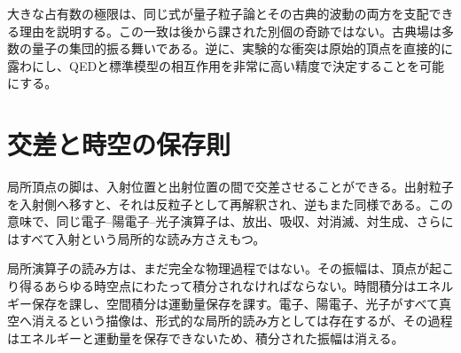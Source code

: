 \begin{classroomqa}
\end{classroomqa}

\begin{classroomqa}
\end{classroomqa}

大きな占有数の極限は、同じ式が量子粒子論とその古典的波動の両方を支配できる理由を説明する。この一致は後から課された別個の奇跡ではない。古典場は多数の量子の集団的振る舞いである。逆に、実験的な衝突は原始的頂点を直接的に露わにし、QEDと標準模型の相互作用を非常に高い精度で決定することを可能にする。

\section{交差と時空の保存則}

局所頂点の脚は、入射位置と出射位置の間で交差させることができる。出射粒子を入射側へ移すと、それは反粒子として再解釈され、逆もまた同様である。この意味で、同じ電子--陽電子--光子演算子は、放出、吸収、対消滅、対生成、さらにはすべて入射という局所的な読み方さえもつ。

\begin{classroomqa}
\end{classroomqa}

局所演算子の読み方は、まだ完全な物理過程ではない。その振幅は、頂点が起こり得るあらゆる時空点にわたって積分されなければならない。時間積分はエネルギー保存を課し、空間積分は運動量保存を課す。電子、陽電子、光子がすべて真空へ消えるという描像は、形式的な局所的読み方としては存在するが、その過程はエネルギーと運動量を保存できないため、積分された振幅は消える。

